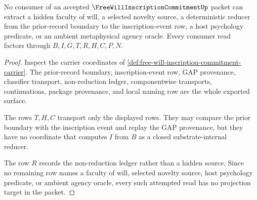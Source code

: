 \begin{theorem}
\label{thm:free-will-inscription-commitment-nonescape}
No consumer of an accepted $\FreeWillInscriptionCommitmentUp$ packet can extract a hidden faculty of will, a selected novelty source, a deterministic reducer from the prior-record boundary to the inscription-event row, a host psychology predicate, or an ambient metaphysical agency oracle. Every consumer read factors through $B,I,G,T,R,H,C,P,N$.
\end{theorem}
\begin{proof}
Inspect the carrier coordinates of \autoref{def:free-will-inscription-commitment-carrier}. The prior-record boundary, inscription-event row, GAP provenance, classifier transport, non-reduction ledger, componentwise transports, continuations, package provenance, and local naming row are the whole exported surface.

The rows $T,H,C$ transport only the displayed rows. They may compare the prior boundary with the inscription event and replay the GAP provenance, but they have no coordinate that computes $I$ from $B$ as a closed substrate-internal reducer.

The row $R$ records the non-reduction ledger rather than a hidden source. Since no remaining row names a faculty of will, selected novelty source, host psychology predicate, or ambient agency oracle, every such attempted read has no projection target in the packet.
\end{proof}

